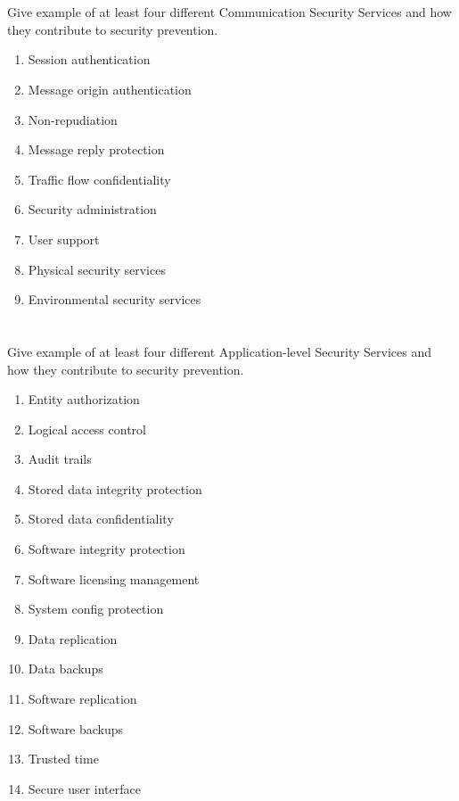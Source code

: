 \begin{questions}
\begin{parts}
  \part{} Give example of at least four different Communication Security Services and how they contribute to security prevention.
    \begin{solution}
      \begin{enumerate}[noitemsep]
      \item Session authentication
      \item Message origin authentication
      \item Non-repudiation
      \item Message reply protection
      \item Traffic flow confidentiality
      \item Security administration
      \item User support
      \item Physical security services
      \item Environmental security services
      \end{enumerate}
    \end{solution}

  \part{} Give example of at least four different Application-level Security Services and how they contribute to security prevention.
    \begin{solution}
      \begin{enumerate}[noitemsep]
      \item Entity authorization
      \item Logical access control
      \item Audit trails
      \item Stored data integrity protection
      \item Stored data confidentiality
      \item Software integrity protection
      \item Software licensing management
      \item System config protection
      \item Data replication
      \item Data backups
      \item Software replication
      \item Software backups
      \item Trusted time
      \item Secure user interface
      \end{enumerate}
    \end{solution}


\end{parts}
\end{questions}
